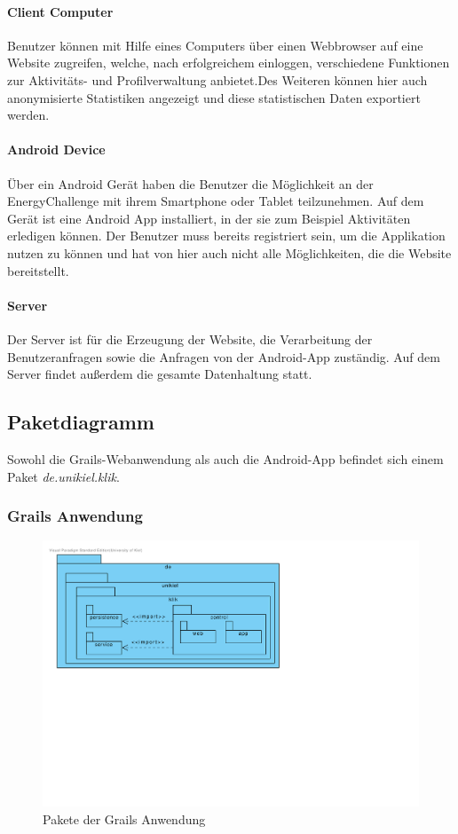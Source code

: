 \paragraph{Client Computer}
Benutzer können mit Hilfe eines Computers über einen Webbrowser auf eine Website zugreifen, welche, nach erfolgreichem einloggen, verschiedene Funktionen zur Aktivitäts- und Profilverwaltung anbietet.Des Weiteren können hier auch anonymisierte Statistiken angezeigt und diese statistischen Daten exportiert werden.

\paragraph{Android Device}
Über ein Android Gerät haben die Benutzer die Möglichkeit an der EnergyChallenge mit ihrem Smartphone oder Tablet teilzunehmen. Auf dem Gerät ist eine Android App installiert, in der sie zum Beispiel Aktivitäten erledigen können. Der Benutzer muss bereits registriert sein, um die Applikation nutzen zu können und hat von hier auch nicht alle Möglichkeiten, die die Website bereitstellt.

\paragraph{Server}
Der Server ist für die Erzeugung der Website, die Verarbeitung der Benutzeranfragen sowie die Anfragen von der Android-App zuständig. Auf dem Server findet außerdem die gesamte Datenhaltung statt.

\subsection{Paketdiagramm}
Sowohl die Grails-Webanwendung als auch die Android-App befindet sich einem Paket \emph{de.unikiel.klik}.

\subsubsection{Grails Anwendung}

\begin{figure}[H]
  \centering
  \includegraphics[width=\textwidth, trim=1cm 10cm 11cm 1cm, clip]{gfx/package_diagram}
  \caption{Pakete der Grails Anwendung}
\end{figure}

